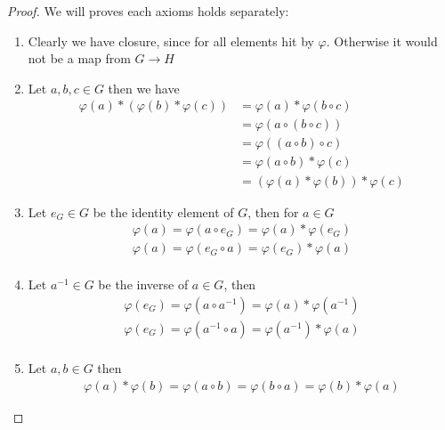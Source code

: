 \documentclass{article}
\theoremstyle{plain}
\theoremstyle{definition}
\begin{document}
\begin{proof}
	We will proves each axioms holds separately:
	\begin{enumerate}
		\item Clearly we have closure, since for all elements hit by $\varphi$. 
			Otherwise it would not be a map from $G \rightarrow H$
		\item Let $a,b,c \in G$ then we have
			\begin{equation}
			\begin{aligned}
				\varphi(a)*(\varphi(b)*\varphi(c)) 
											 &=\varphi(a)*\varphi(b\circ c)\\
											 &= \varphi(a\circ(b\circ c))\\
											 &= \varphi((a\circ b)\circ c) \\
											 &= \varphi(a\circ b)*\varphi(c)\\
											 &= (\varphi(a)*\varphi(b))*\varphi(c)
			\end{aligned}
			\end{equation}
		\item Let $e_G\in G$ be the identity element of $G$, then for $a\in G$
			\begin{equation}
			\begin{aligned}
				\varphi(a) = \varphi(a\circ e_G) = \varphi(a)*\varphi(e_G) \\
				\varphi(a) = \varphi(e_G\circ a) = \varphi(e_G)*\varphi(a) \\
			\end{aligned}
			\end{equation}
		\item Let $a^{-1} \in G$ be the inverse of $a\in G$, then
			\begin{equation}
			\begin{aligned}
				\varphi(e_G)=\varphi(a\circ a^{-1})=\varphi(a)*\varphi(a^{-1})\\
				\varphi(e_G)=\varphi(a^{-1}\circ a)=\varphi(a^{-1})*\varphi(a)\\
			\end{aligned}
			\end{equation}
		\item Let $a,b\in G$ then
			\begin{equation}
			\begin{aligned}
				\varphi(a)*\varphi(b) = \varphi(a\circ b) = \varphi(b\circ a)
				= \varphi(b)*\varphi(a)
			\end{aligned}
			\end{equation}
	\end{enumerate}
\end{proof}
\end{document}
